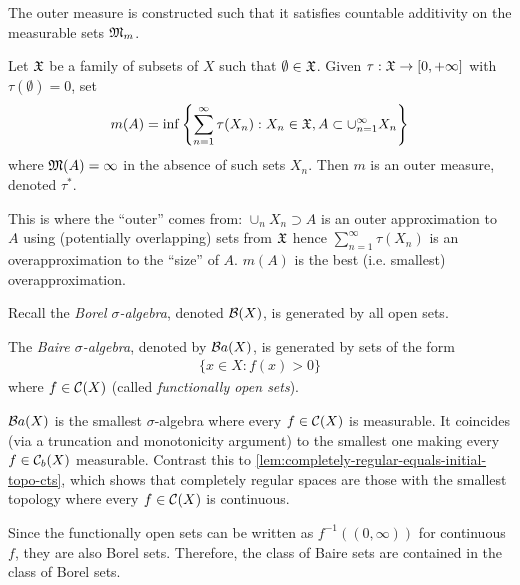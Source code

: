 \begin{remark}
  The outer measure is constructed such that it satisfies
  countable additivity on the measurable sets $\mathfrak{M}_m$.
\end{remark}

\begin{example}
  Let $\mathfrak{X}$ be a family of subsets of $X$ such that $\emptyset \in \mathfrak{X}$.
  Given $\tau : \mathfrak{X} \to [0,+\infty]$ with $\tau(\emptyset) = 0$, set
  \[
    m(A) = \inf\left\{
      \sum_{n=1}^\infty \tau(X_n) : X_n \in \mathfrak{X}, A \subset \cup_{n=1}^\infty X_n
    \right\}
  \]
  where $\mathfrak{M}(A) = \infty$ in the absence of such sets $X_n$.
  Then $m$ is an outer measure, denoted $\tau^*$.

  This is where the ``outer'' comes from: $\cup_n X_n \supset A$
  is an outer approximation to $A$ using (potentially overlapping)
  sets from $\mathfrak{X}$ hence $\sum_{n=1}^\infty \tau(X_n)$ is an overapproximation
  to the ``size'' of $A$. $m(A)$ is the best (i.e. smallest) overapproximation.
\end{example}

Recall the \emph{Borel $\sigma$-algebra}, denoted $\mathcal{B}(X)$, is generated by all
open sets.

\begin{definition}
  The \emph{Baire $\sigma$-algebra}, denoted by $\mathcal{B}a(X)$,
  is generated by sets of the form
  \begin{align}
    \label{eq:functionally-open}
    \{x \in X : f(x) > 0 \}
  \end{align}
  where $f \in \mathcal{C}(X)$ (called \emph{functionally open sets}).
\end{definition}

\begin{remark}
  $\mathcal{B}a(X)$ is the smallest $\sigma$-algebra where every $f \in \mathcal{C}(X)$ is
  measurable. It coincides (via a truncation and monotonicity argument) to
  the smallest one making every $f \in \mathcal{C}_b(X)$ measurable.
  Contrast this to \cref{lem:completely-regular-equals-initial-topo-cts}, which
  shows that completely regular spaces are those with the smallest topology
  where every $f \in \mathcal{C}(X)$ is continuous.
\end{remark}

\begin{remark}
  Since the functionally open sets can be written as $f^{-1}((0, \infty))$
  for continuous $f$, they are also Borel sets. Therefore,
  the class of Baire sets are contained in the class of Borel sets.
\end{remark}

